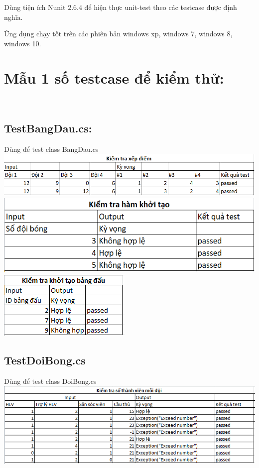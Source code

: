 \documentclass[a4paper]{article}
\begin{document}
Dùng tiện ích Nunit 2.6.4 để hiện thực unit-test theo các testcase được định nghĩa.

Ứng dụng chạy tốt trên các phiên bản windows xp, windows 7, windows 8,  windows 10.
\section{Mẫu 1 số testcase để kiểm thử:}\\
\subsection{TestBangDau.cs:}
Dùng để test class BangDau.cs\\

\includegraphics[scale=0.45]{hinh6.png}  \\ 

\includegraphics[scale=0.5]{hinh5.png}\\

\includegraphics[scale=0.8]{hinh7.png}\\


\subsection{TestDoiBong.cs}
Dùng để test class DoiBong.cs\\

\includegraphics[scale=0.6]{hinh9.png}  \\ 
\end{document}
